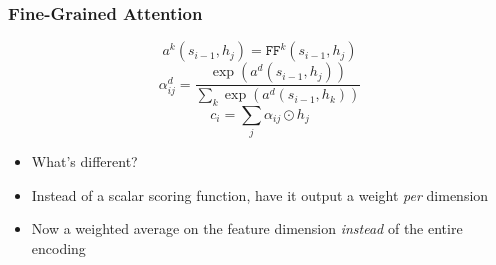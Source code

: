 \documentclass[usenames,dvipsnames]{beamer}
\begin{document}
\begin{frame}
\frametitle{Fine-Grained Attention}
\begin{equation*}
  a^k \left( s_{i-1}, h_j \right) = \texttt{FF}^k(s_{i-1}, h_j)
\end{equation*}
\begin{equation*}
  \alpha_{ij}^d = \frac{\exp\left(a^d\left(s_{i-1}, h_j\right)\right)}{\sum_k \exp \left( a^d \left(s_{i-1}, h_k\right) \right)}
\end{equation*}
\begin{equation*}
  c_i = \sum_j \alpha_{ij} \odot h_j
\end{equation*}
\begin{itemize}
  \item What's different?
  \item Instead of a scalar scoring function, have it output a weight \textit{per} dimension
  \item Now a weighted average on the feature dimension \textit{instead} of the entire encoding
\end{itemize}
\end{frame}
\end{document}
